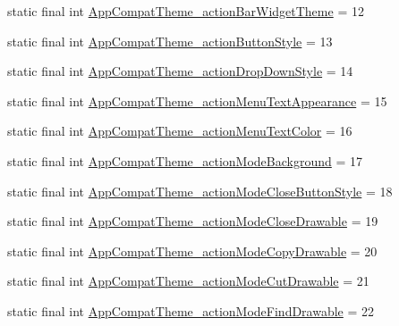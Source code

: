 \begin{DoxyCompactItemize}
\item 
static final int \mbox{\hyperlink{classandroid_1_1support_1_1v7_1_1appcompat_1_1R_1_1styleable_acb8aa290e7ba8e77646018aae97d38f4}{App\+Compat\+Theme\+\_\+action\+Bar\+Widget\+Theme}} = 12
\item 
static final int \mbox{\hyperlink{classandroid_1_1support_1_1v7_1_1appcompat_1_1R_1_1styleable_afeeb64c90f9ae75e7a1b895339cee690}{App\+Compat\+Theme\+\_\+action\+Button\+Style}} = 13
\item 
static final int \mbox{\hyperlink{classandroid_1_1support_1_1v7_1_1appcompat_1_1R_1_1styleable_aa11a6d533a356428ce240d2754fd06b3}{App\+Compat\+Theme\+\_\+action\+Drop\+Down\+Style}} = 14
\item 
static final int \mbox{\hyperlink{classandroid_1_1support_1_1v7_1_1appcompat_1_1R_1_1styleable_ae86b38d19839d592116e4074400c1e27}{App\+Compat\+Theme\+\_\+action\+Menu\+Text\+Appearance}} = 15
\item 
static final int \mbox{\hyperlink{classandroid_1_1support_1_1v7_1_1appcompat_1_1R_1_1styleable_abb0739dbd98e0865a603a331ffccf69a}{App\+Compat\+Theme\+\_\+action\+Menu\+Text\+Color}} = 16
\item 
static final int \mbox{\hyperlink{classandroid_1_1support_1_1v7_1_1appcompat_1_1R_1_1styleable_aa393102c6de23f6c0fb9a77e5c1d91ca}{App\+Compat\+Theme\+\_\+action\+Mode\+Background}} = 17
\item 
static final int \mbox{\hyperlink{classandroid_1_1support_1_1v7_1_1appcompat_1_1R_1_1styleable_ae6758f3f0a8f30e0cf030d6c891b319c}{App\+Compat\+Theme\+\_\+action\+Mode\+Close\+Button\+Style}} = 18
\item 
static final int \mbox{\hyperlink{classandroid_1_1support_1_1v7_1_1appcompat_1_1R_1_1styleable_a3130d5ac1f7e9e6f0c9eb07c18cb214d}{App\+Compat\+Theme\+\_\+action\+Mode\+Close\+Drawable}} = 19
\item 
static final int \mbox{\hyperlink{classandroid_1_1support_1_1v7_1_1appcompat_1_1R_1_1styleable_ae801af5e60cdafc763cc596213255c88}{App\+Compat\+Theme\+\_\+action\+Mode\+Copy\+Drawable}} = 20
\item 
static final int \mbox{\hyperlink{classandroid_1_1support_1_1v7_1_1appcompat_1_1R_1_1styleable_a1c8391408fc1ddfd05f29a74aa2164c3}{App\+Compat\+Theme\+\_\+action\+Mode\+Cut\+Drawable}} = 21
\item 
static final int \mbox{\hyperlink{classandroid_1_1support_1_1v7_1_1appcompat_1_1R_1_1styleable_a2c38964f45322d64ab0aeae35598ae59}{App\+Compat\+Theme\+\_\+action\+Mode\+Find\+Drawable}} = 22
\item 

\end{DoxyCompactItemize}
